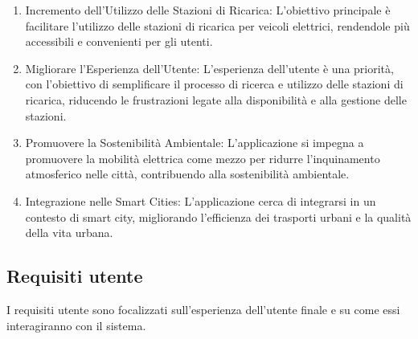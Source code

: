 \begin{enumerate}
    \item Incremento dell'Utilizzo delle Stazioni di Ricarica: L'obiettivo principale è facilitare l'utilizzo delle stazioni di ricarica per veicoli elettrici, rendendole più accessibili e convenienti per gli utenti.

    \item Migliorare l'Esperienza dell'Utente: L'esperienza dell'utente è una priorità, con l'obiettivo di semplificare il processo di ricerca e utilizzo delle stazioni di ricarica, riducendo le frustrazioni legate alla disponibilità e alla gestione delle stazioni.

    \item Promuovere la Sostenibilità Ambientale: L'applicazione si impegna a promuovere la mobilità elettrica come mezzo per ridurre l'inquinamento atmosferico nelle città, contribuendo alla sostenibilità ambientale.

    \item Integrazione nelle Smart Cities: L'applicazione cerca di integrarsi in un contesto di smart city, migliorando l'efficienza dei trasporti urbani e la qualità della vita urbana.
\end{enumerate}

\subsection{Requisiti utente}
I requisiti utente sono focalizzati sull'esperienza dell'utente finale e su come essi interagiranno con il sistema.

